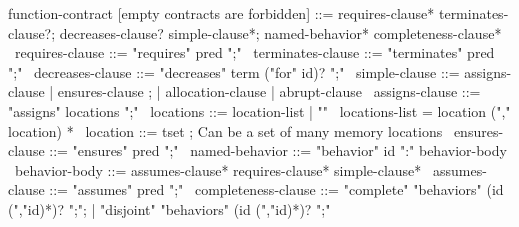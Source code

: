 \begin{syntax}
  function-contract [empty contracts are forbidden] ::= requires-clause* terminates-clause?;
                        decreases-clause? simple-clause*;
                        named-behavior* completeness-clause*
  \
  requires-clause ::= "requires" pred ";"
  \
  terminates-clause ::= "terminates" pred ";"
  \
  decreases-clause ::= "decreases" term ("for" id)? ";"
  \
  simple-clause ::= assigns-clause | ensures-clause ;
                | allocation-clause | abrupt-clause 
  \
  assigns-clause ::= "assigns" locations ";"
  \
  locations ::= location-list | "\nothing"
  \
  locations-list = location ("," location) *
  \
  location ::= tset  ; Can be a set of many memory locations
  \
  ensures-clause ::= "ensures" pred ";"
  \
  named-behavior ::= "behavior" id ":" behavior-body
  \
  behavior-body ::= assumes-clause* requires-clause* simple-clause* 
  \
  assumes-clause ::= "assumes" pred ";"
  \
  completeness-clause ::= "complete" "behaviors" (id (","id)*)? ";";
     | "disjoint" "behaviors" (id (","id)*)? ";"
\end{syntax}
